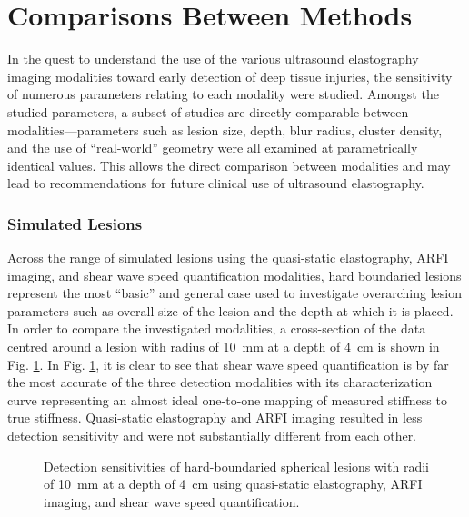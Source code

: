 	\section{Comparisons Between Methods}
	\label{sec:method_comparisons}
		In the quest to understand the use of the various ultrasound elastography imaging modalities toward early detection of deep tissue injuries, the sensitivity of numerous parameters relating to each modality were studied. Amongst the studied parameters, a subset of studies are directly comparable between modalities---parameters such as lesion size, depth, blur radius, cluster density, and the use of ``real-world'' geometry were all examined at parametrically identical values. This allows the direct comparison between modalities and may lead to recommendations for future clinical use of ultrasound elastography.

		\subsubsection{Simulated Lesions}
		\label{subsubsec:conclusion_simulated_lesions}
			Across the range of simulated lesions using the quasi-static elastography, ARFI imaging, and shear wave speed quantification modalities, hard boundaried lesions represent the most ``basic'' and general case used to investigate overarching lesion parameters such as overall size of the lesion and the depth at which it is placed. In order to compare the investigated modalities, a cross-section of the data centred around a lesion with radius of \SI{10}{\mm} at a depth of \SI{4}{\cm} is shown in Fig. \ref{fig:conclusion_radius}. In Fig. \ref{fig:conclusion_radius}, it is clear to see that shear wave speed quantification is by far the most accurate of the three detection modalities with its characterization curve representing an almost ideal one-to-one mapping of measured stiffness to true stiffness. Quasi-static elastography and ARFI imaging resulted in less detection sensitivity and were not substantially different from each other.

			\begin{figure}[!htb]
				\centering
				\caption[Detection sensitivities of hard-boundaried spherical lesions using the three investigated imaging modalities]{Detection sensitivities of hard-boundaried spherical lesions with radii of \SI{10}{\mm} at a depth of \SI{4}{\cm} using quasi-static elastography, ARFI imaging, and shear wave speed quantification.}
				\label{fig:conclusion_radius}
			\end{figure}

